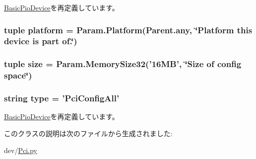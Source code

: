 \hyperlink{classDevice_1_1BasicPioDevice_ac3f272675842a6662ce8782e10fdba39}{BasicPioDevice}を再定義しています。\hypertarget{classPci_1_1PciConfigAll_ae6d09ca44893db6cdb66d62deaa1aefd}{
\subsubsection[{platform}]{\setlength{\rightskip}{0pt plus 5cm}tuple {\bf platform} = Param.Platform(Parent.any, \char`\"{}Platform this device is part of.\char`\"{})}}
\label{classPci_1_1PciConfigAll_ae6d09ca44893db6cdb66d62deaa1aefd}
\hypertarget{classPci_1_1PciConfigAll_a377e5da8df1f89c5468c8b8cd07eac89}{
\subsubsection[{size}]{\setlength{\rightskip}{0pt plus 5cm}tuple {\bf size} = Param.MemorySize32('16MB', \char`\"{}Size of config space\char`\"{})}}
\label{classPci_1_1PciConfigAll_a377e5da8df1f89c5468c8b8cd07eac89}
\hypertarget{classPci_1_1PciConfigAll_acce15679d830831b0bbe8ebc2a60b2ca}{
\subsubsection[{type}]{\setlength{\rightskip}{0pt plus 5cm}string {\bf type} = '{\bf PciConfigAll}'}}
\label{classPci_1_1PciConfigAll_acce15679d830831b0bbe8ebc2a60b2ca}


\hyperlink{classDevice_1_1BasicPioDevice_acce15679d830831b0bbe8ebc2a60b2ca}{BasicPioDevice}を再定義しています。

このクラスの説明は次のファイルから生成されました:\begin{DoxyCompactItemize}
\item 
dev/\hyperlink{Pci_8py}{Pci.py}\end{DoxyCompactItemize}
